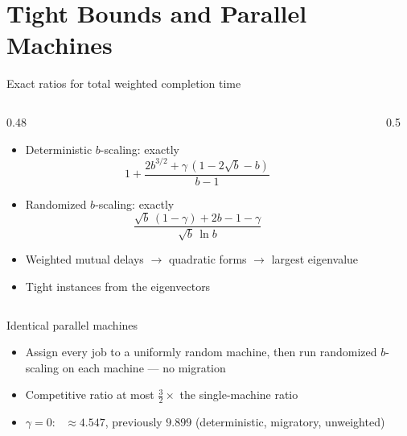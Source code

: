 \documentclass[aspectratio=169,11pt]{beamer}
\newcommand{\src}[2][]{{\footnotesize\color{ztgray}%
  \if\relax\detokenize{#1}\relax\cite{#2}\else\cite[#1]{#2}\fi}}
\begin{document}
\section[Tight Bounds]{Tight Bounds and Parallel Machines}

\begin{frame}{Exact ratios for total weighted completion time}
  \begin{columns}[c]
    \begin{column}{0.48\textwidth}
      \begin{itemize}
        \item Deterministic $b$-scaling: exactly
          \[ 1 + \frac{2b^{3/2} + \gamma\,(1 - 2\sqrt{b} - b)}{b-1} \]
        \item Randomized $b$-scaling: exactly
          \[ \frac{\sqrt{b}\,(1-\gamma) + 2b - 1 - \gamma}{\sqrt{b}\,\ln b} \]
        \item Weighted mutual delays $\to$ quadratic forms $\to$ largest eigenvalue
        \item Tight instances from the eigenvectors
      \end{itemize}
    \end{column}
    \begin{column}{0.5\textwidth}
      \centering
      
    \end{column}
  \end{columns}
\end{frame}

\begin{frame}{Identical parallel machines}
  \centering
  
  \vfill
  \begin{itemize}
    \item Assign every job to a uniformly random machine, then run randomized
          $b$-scaling on each machine --- \alert{no migration}
    \item Competitive ratio at most $\tfrac32 \times$ the single-machine ratio
    \item $\gamma = 0$: \ $\approx 4.547$, previously $9.899$
          (deterministic, migratory, unweighted) \src{jssw25}
  \end{itemize}
\end{frame}
\end{document}
